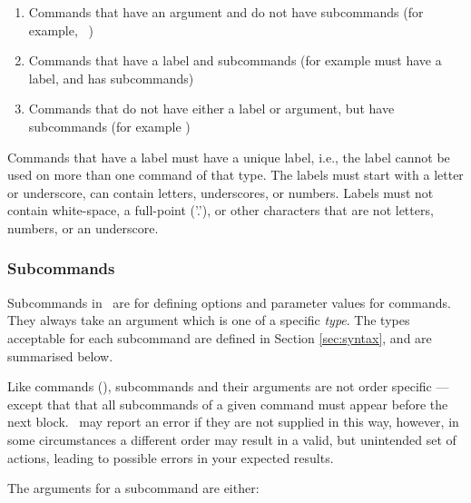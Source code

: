 \begin{enumerate}
\item Commands that have an argument and do not have subcommands (for example, \ )
\item Commands that have a label and subcommands (for example  must have a label, and has subcommands)
\item Commands that do not have either a label or argument, but have subcommands (for example )
\end{enumerate}

Commands that have a label must have a unique label, i.e., the label cannot be used on more than one command of that type. The labels must start with a letter or underscore, can contain letters, underscores, or numbers. Labels must not contain white-space, a full-point ('.'), or other characters that are not letters, numbers, or an underscore.
\EX \EXend

\subsubsection{Subcommands}
\CH
Subcommands in \SAM\ are for defining options and parameter values for commands. They always take an argument which is one of a specific \emph{type}. The types acceptable for each subcommand are defined in Section \ref{sec:syntax}, and are summarised below. 

Like commands (), subcommands and their arguments are not order specific --- except that that all subcommands of a given command must appear before the next  block. \SAM\ may report an error if they are not supplied in this way, however, in some circumstances a different order may result in a valid, but unintended set of actions, leading to possible errors in your expected results.  

The arguments for a subcommand are either:

